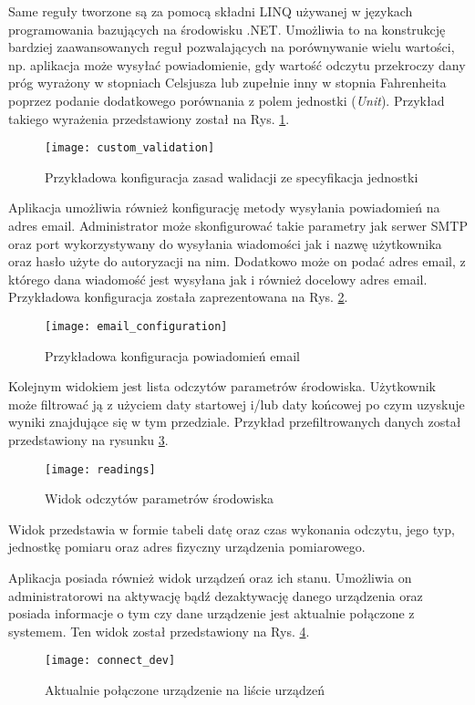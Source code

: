 Same reguły tworzone są za pomocą składni LINQ używanej w językach programowania
bazujących na środowisku .NET. Umożliwia to na konstrukcję bardziej zaawansowanych reguł
pozwalających na porównywanie wielu wartości, np. aplikacja może wysyłać powiadomienie, gdy
wartość odczytu przekroczy dany próg wyrażony w stopniach Celsjusza lub zupełnie inny
w stopnia Fahrenheita poprzez podanie dodatkowego porównania z polem jednostki (\textit{Unit}).
Przykład takiego wyrażenia przedstawiony został na Rys. \ref{atmosphere:custom_validation}.
\begin{figure}[h!]
  \centering
  \texttt{[image: custom\_validation]}
  \caption{Przykładowa konfiguracja zasad walidacji ze specyfikacja jednostki}
  \label{atmosphere:custom_validation}
\end{figure}
Aplikacja umożliwia również konfigurację metody wysyłania powiadomień na adres email.
Administrator może skonfigurować takie parametry jak serwer SMTP oraz port wykorzystywany
do wysyłania wiadomości jak i nazwę użytkownika oraz hasło użyte do autoryzacji na nim.
Dodatkowo może on podać adres email, z którego dana wiadomość jest wysyłana jak i również
docelowy adres email. Przykładowa konfiguracja została zaprezentowana na Rys. \ref{atmosphere:email_configuration}.
\begin{figure}[h!]
  \centering
  \texttt{[image: email\_configuration]}
  \caption{Przykładowa konfiguracja powiadomień email}
  \label{atmosphere:email_configuration}
\end{figure}

Kolejnym widokiem jest lista odczytów parametrów środowiska. Użytkownik może 
filtrować ją z użyciem daty startowej i/lub daty końcowej po czym uzyskuje
wyniki znajdujące się w tym przedziale. Przykład przefiltrowanych danych
został przedstawiony na rysunku \ref{atmosphere:readings}.
\begin{figure}[h!]
  \centering
  \texttt{[image: readings]}
  \caption{Widok odczytów parametrów środowiska}
  \label{atmosphere:readings}
\end{figure}
Widok przedstawia w formie tabeli datę oraz czas wykonania odczytu, jego typ,
jednostkę pomiaru oraz adres fizyczny urządzenia pomiarowego.

Aplikacja posiada również widok urządzeń oraz ich stanu. Umożliwia on administratorowi
na aktywację bądź dezaktywację danego urządzenia oraz posiada informacje o tym czy 
dane urządzenie jest aktualnie połączone z systemem.
Ten widok został przedstawiony na Rys. \ref{device_list}.
\begin{figure}[h!]
  \centering
  \texttt{[image: connect\_dev]}
  \caption{Aktualnie połączone urządzenie na liście urządzeń}
  \label{device_list}
\end{figure}


